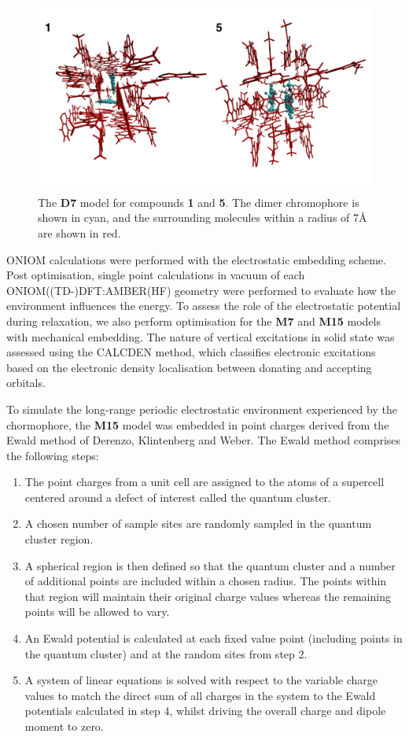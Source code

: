 \begin{figure}
\centering
  \includegraphics[width=0.9\linewidth]{4IntraInterInteractions/HC_Dimer_Models.pdf}
  \caption[The \textbf{D7} cluster models]{The \textbf{D7} model for compounds \textbf{1} and \textbf{5}. The dimer chromophore is shown in cyan, and the surrounding molecules within a radius of 7{\AA} are shown in red.}
  \label{figure: HC_Dimer_Models}
\end{figure}

ONIOM calculations were performed with the electrostatic embedding scheme. Post optimisation, single point calculations in vacuum of each ONIOM((TD-)DFT:AMBER(HF) geometry were performed to evaluate how the environment influences the energy. To assess the role of the electrostatic potential during relaxation, we also perform optimisation for the \textbf{M7} and \textbf{M15} models with mechanical embedding. The nature of vertical excitations in solid state was assessed using the CALCDEN method, which classifies electronic excitations based on the electronic density localisation between donating and accepting orbitals.\cite{Crespo-Otero2012,Sen2013} 

To simulate the long-range periodic electrostatic environment experienced by the chormophore, the \textbf{M15} model was embedded in point charges derived from the Ewald method of Derenzo, Klintenberg and Weber.\cite{Klintenberg2000,Derenzo2000} The Ewald method comprises the following steps:
\begin{enumerate}
\item The point charges from a unit cell are assigned to the atoms of a supercell centered around a defect of interest called the quantum cluster.
\item A chosen number of sample sites are randomly sampled in the quantum cluster region.
\item A spherical region is then defined so that the quantum cluster and a number of additional points are included within a chosen radius. The points within that region will maintain their original charge values whereas the remaining points will be allowed to vary.
\item An Ewald potential is calculated at each fixed value point (including points in the quantum cluster) and at the random sites from step 2.
\item A system of linear equations is solved with respect to the variable charge values to match the direct sum of all charges in the system to the Ewald potentials calculated in step 4, whilst driving the overall charge and dipole moment to zero.
\end{enumerate}

